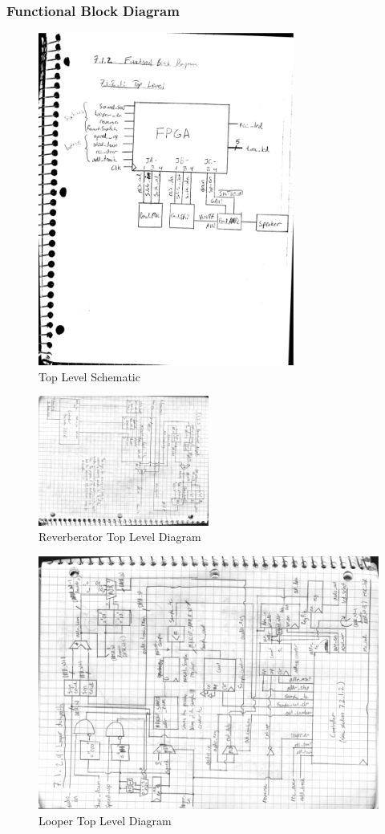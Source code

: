 \documentclass[12pt]{article}
\begin{document}
\subsubsection{Functional Block Diagram}
\begin{figure}[!htb]
\centering
\includegraphics[width=0.75\textwidth, height=0.85\textheight]{toplevel_schem.eps}
\caption{Top Level Schematic}
\end{figure}

\begin{figure}[!htb]
\centering
\includegraphics[width=0.5\textwidth, height=0.5\textheight, angle=90]{reverberator.eps}
\caption{Reverberator Top Level Diagram}
\end{figure}

\begin{figure}[!htb]
\centering
\includegraphics[width=.5\textwidth, height=.5\textheight, angle=270]{looper.eps}
\caption{Looper Top Level Diagram}
\end{figure}
\end{document}
